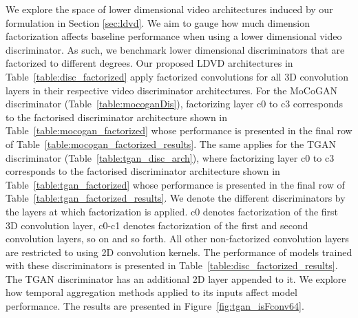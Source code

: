 \documentclass[a4paper,fleqn]{cas-sc}
\begin{document}
We explore the space of lower dimensional video architectures induced by our formulation in Section \ref{sec:ldvd}. We aim to gauge how much dimension factorization affects baseline performance when using a lower dimensional video discriminator. As such, we benchmark lower dimensional discriminators that are factorized to different degrees. 
Our proposed LDVD architectures in Table~\ref{table:disc_factorized} apply factorized convolutions for all 3D convolution layers in their respective video discriminator architectures. For the MoCoGAN discriminator (Table~\ref{table:mocoganDis}), factorizing layer c0 to c3 corresponds to the factorised discriminator architecture shown in  Table~\ref{table:mocogan_factorized} whose performance is presented in the final row of Table~\ref{table:mocogan_factorized_results}. The same applies for the TGAN discriminator (Table~\ref{table:tgan_disc_arch}), where factorizing layer c0 to c3 corresponds to the factorised discriminator architecture shown in Table~\ref{table:tgan_factorized} whose performance is presented in the final row of Table~\ref{table:tgan_factorized_results}. We denote the different discriminators by the layers at which factorization is applied. c0 denotes factorization of the first 3D convolution layer, c0-c1 denotes factorization of the first and second convolution layers, so on and so forth. All other non-factorized convolution layers are restricted to using 2D convolution kernels. The performance of models trained with these discriminators is presented in Table~\ref{table:disc_factorized_results}. The TGAN discriminator has an additional 2D layer appended to it. We explore how temporal aggregation methods applied to its inputs affect model performance. The results are presented in Figure~\ref{fig:tgan_isFconv64}.
\end{document}
